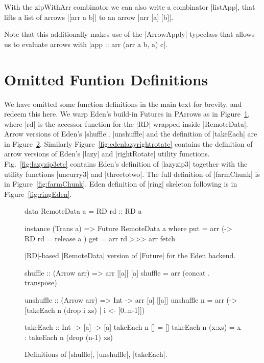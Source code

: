 With the zipWithArr combinator we can also write a combinator |listApp|, that lifts a list of arrows |[arr a b]| to an arrow |arr [a] [b]|.
Note that  this additionally makes use of the |ArrowApply| typeclass that allows us to evaluate arrows with |app :: arr (arr a b, a) c|.


\section{Omitted Funtion Definitions}

We have omitted some function definitions in the main text for
brevity, and redeem this here.
%
We warp Eden's build-in Futures in PArrows as in
Figure~\ref{fig:RDFuture}, where |rd| is the accessor function for the |RD| wrapped inside |RemoteData|. Arrow versions of Eden's |shuffle|, |unshuffle| and the definition of |takeEach| are in Figure~\ref{fig:edenshuffleetc}. Similarly Figure~\ref{fig:edenlazyrightrotate} contains the definition of arrow versions of Eden's |lazy| and |rightRotate| utility functions. Fig.~\ref{fig:lazyzip3etc} contains Eden's definition of |lazyzip3| together with the utility functions |uncurry3| and |threetotwo|.
The full definition of |farmChunk| is in Figure~\ref{fig:farmChunk}.
Eden definition of |ring| skeleton following \citep{Loogen2012} is in Figure~\ref{fig:ringEden}.


\begin{figure}[h]
\begin{code}
data RemoteData a = RD { rd :: RD a }

instance (Trans a) => Future RemoteData a where
    put = arr (\a -> RD { rd = release a })
    get = arr rd >>> arr fetch
\end{code}
\caption{|RD|-based |RemoteData| version of |Future| for the Eden backend.}
\label{fig:RDFuture}
\end{figure}

\begin{figure}[h]
\begin{code}
shuffle :: (Arrow arr) => arr [[a]] [a]
shuffle = arr (concat . transpose)

unshuffle :: (Arrow arr) => Int -> arr [a] [[a]]
unshuffle n = arr (\xs -> [takeEach n (drop i xs) | i <- [0..n-1]])

takeEach :: Int -> [a] -> [a]
takeEach n [] = []
takeEach n (x:xs) = x : takeEach n (drop (n-1) xs)
\end{code}
\caption{Definitions of |shuffle|, |unshuffle|, |takeEach|.}
\label{fig:edenshuffleetc}
\end{figure}

